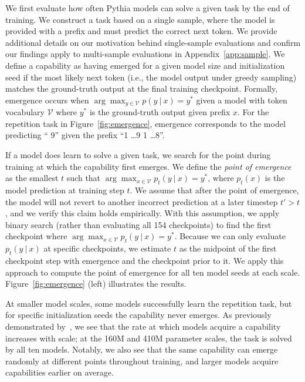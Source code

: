 \documentclass{article}
\newcommand{\given}{\ |\ }
\begin{document}
We first evaluate how often Pythia models can solve a given task by the end of training. We construct a task based on a single sample, where the model is provided with a prefix and must predict the correct next token. We provide additional details on our motivation behind single-sample evaluations and confirm our findings apply to multi-sample evaluations in Appendix~\ref{app:sample}.
We define a capability as having emerged for a given model size and initialization seed if the most likely next token (i.e., the model output under greedy sampling) matches the ground-truth output at the final training checkpoint. Formally, emergence occurs when $\arg\max_{y\in \mathcal V}p(y\ |\ x)=y^*$ given a model with token vocabulary $\mathcal V$ where $y^*$ is the ground-truth output given prefix $x$. For the repetition task in Figure~\ref{fig:emergence}, emergence corresponds to the model predicting `` 9'' given the prefix ``1 \dots 9 1 \dots 8''.

If a model does learn to solve a given task, we search for the point during training at which the capability first emerges. We define the \textit{point of emergence} as the smallest $t$ such that $\arg \max_{x\in \mathcal V} p_t(y\given x)=y^*$, where $p_t(x)$ is the model prediction at training step $t$. We assume that after the point of emergence, the model will not revert to another incorrect prediction at a later timestep $t'>t$, and we verify this claim holds empirically. With this assumption, we apply binary search (rather than evaluating all 154 checkpoints) to find the first checkpoint where $\arg \max_{x\in \mathcal V} p_t(y\given x)=y^*$. Because we can only evaluate $p_t(y\given x)$ at specific checkpoints, we estimate $t$ as the midpoint of the first checkpoint step with emergence and the checkpoint prior to it. We apply this approach to compute the point of emergence for all ten model seeds at each scale. Figure~\ref{fig:emergence} (left) illustrates the results. 


At smaller model scales, some models successfully learn the repetition task, but for specific initialization seeds the capability never emerges. As previously demonstrated by~\citet{zhao2026randomscalingemergentcapabilities}, we see that the rate at which models acquire a capability increases with scale; at the 160M and 410M parameter scales, the task is solved by all ten models. Notably, we also see that the same capability can emerge randomly at different points throughout training, and larger models acquire capabilities earlier on average.
\end{document}
